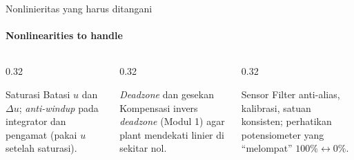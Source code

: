 \documentclass[aspectratio=169,10pt]{beamer}
\begin{document}
\begin{frame}{Nonlinieritas yang harus ditangani}
	\framesubtitle{Nonlinearities to handle}
	\begin{columns}[T]
		\begin{column}{0.32\textwidth}
			\begin{block}{Saturasi}
				\small
				Batasi $u$ dan $\Delta u$; \textit{anti-windup} pada integrator dan pengamat (pakai $u$ setelah saturasi).
			\end{block}
		\end{column}
		\begin{column}{0.32\textwidth}
			\begin{block}{\textit{Deadzone} dan gesekan}
				\small
				Kompensasi invers \textit{deadzone} (Modul 1) agar plant mendekati linier di sekitar nol.
			\end{block}
		\end{column}
		\begin{column}{0.32\textwidth}
			\begin{block}{Sensor}
				\small
				Filter anti-alias, kalibrasi, satuan konsisten; perhatikan potensiometer yang ``melompat'' $100\% \leftrightarrow 0\%$.
			\end{block}
		\end{column}
	\end{columns}
	\vspace{0.3cm}
\end{frame}
\end{document}
